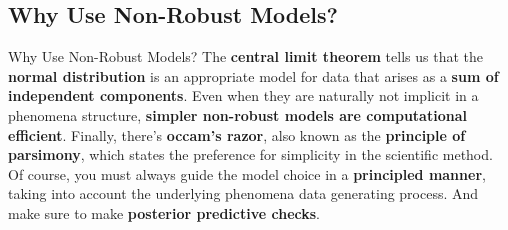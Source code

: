 \subsection{Why Use Non-Robust Models?}
\begin{frame}{Why Use Non-Robust Models?}
	The \textbf{central limit theorem} tells us that the \textbf{normal distribution}
	is an appropriate model for data that arises as a
	\textbf{sum of independent components}.
	\vfill
	Even when they are naturally not implicit in a phenomena structure,
	\textbf{simpler non-robust models are computational efficient}.
	\vfill
	Finally, there's \textbf{occam's razor},
	also known as the \textbf{principle of parsimony},
	which states the preference for simplicity in the scientific method.
	\vfill
	Of course, you must always guide the model choice in a
	\textbf{principled manner},
	taking into account the underlying phenomena data generating process.
	And make sure to make \textbf{posterior predictive checks}.
\end{frame}
